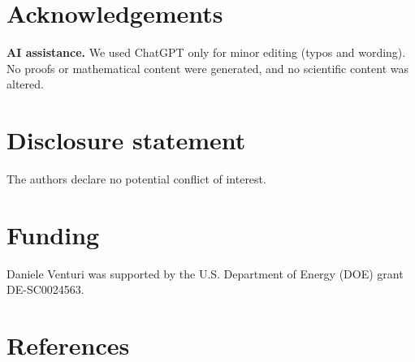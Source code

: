 \documentclass[]{interact}
\newcommand{\1}{\mathbf{1}}
\theoremstyle{plain}%
\theoremstyle{definition}
\theoremstyle{remark}
\numberwithin{equation}{section}
\begin{document}

%

\section*{Acknowledgements}
\noindent\textbf{AI assistance.} We used ChatGPT only for minor editing (typos and wording). No proofs or mathematical content were generated, and no scientific content was altered.





\section*{Disclosure statement}
The authors declare no potential conflict of interest.


\section*{Funding}
Daniele Venturi was supported by the U.S. Department of Energy (DOE) grant DE-SC0024563.







\section{References}
\end{document}
